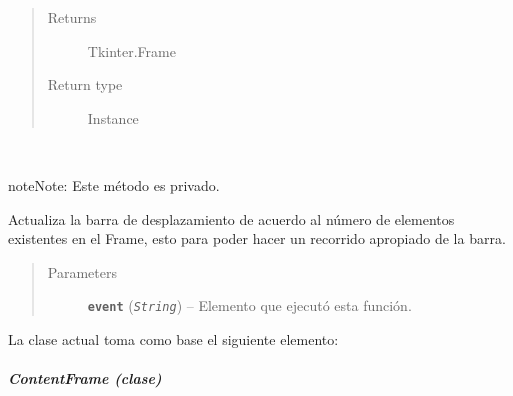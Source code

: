 \documentclass[letterpaper,10pt,english]{sphinxmanual}
\begin{document}
\begin{fulllineitems}
\begin{quote}
\begin{description}
\begin{itemize}
\end{itemize}

\item[{Returns}] \leavevmode
Tkinter.Frame

\item[{Return type}] \leavevmode
Instance

\end{description}\end{quote}

\begin{fulllineitems}
\label{View/Additional/ResultsGrapher/SummaryFrame:View.Additional.ResultsGrapher.SummaryFrame.SummaryFrame._SummaryFrame__update_scrollbar}~
\begin{notice}{note}{Note:}
Este método es privado.
\end{notice}

Actualiza la barra de desplazamiento de acuerdo al número de elementos
existentes en el Frame, esto para poder hacer un recorrido apropiado de 
la barra.
\begin{quote}\begin{description}
\item[{Parameters}] \leavevmode
\textbf{\texttt{event}} (\emph{\texttt{String}}) -- Elemento que ejecutó esta función.

\end{description}\end{quote}

\end{fulllineitems}


\end{fulllineitems}


La clase actual toma como base el siguiente elemento:


\subparagraph{ContentFrame (clase)}
\label{View/Additional/ResultsGrapher/ContentFrame::doc}\label{View/Additional/ResultsGrapher/ContentFrame:contentframe-clase}\label{View/Additional/ResultsGrapher/ContentFrame:module-View.Additional.ResultsGrapher.ContentFrame}
\end{document}
